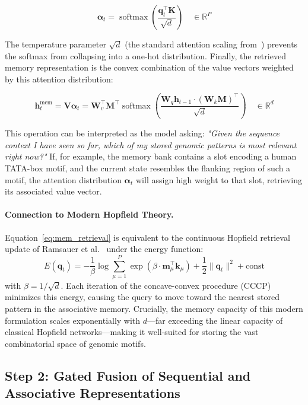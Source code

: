 \documentclass[journal,10pt]{IEEEtran}
\newcommand{\R}{\mathbb{R}}
\newcommand{\softmax}{\operatorname{softmax}}
\begin{document}
\begin{equation}
    \bm{\alpha}_t = \softmax\left( \frac{\bm{q}_t^\top \bm{K}}{\sqrt{d}} \right) \quad \in \R^P
    \label{eq:mem_attention}
\end{equation}

The temperature parameter $\sqrt{d}$ (the standard attention scaling from~\cite{vaswani2017attention}) prevents the softmax from collapsing into a one-hot distribution. Finally, the retrieved memory representation is the convex combination of the value vectors weighted by this attention distribution:

\begin{equation}
    \bm{h}_t^{\text{mem}} = \bm{V} \bm{\alpha}_t = \bm{W}_v^\top \bm{M}^\top \softmax\left( \frac{\bm{W}_q \bm{h}_{t-1} \cdot (\bm{W}_k \bm{M})^\top}{\sqrt{d}} \right) \quad \in \R^d
    \label{eq:mem_retrieval}
\end{equation}

This operation can be interpreted as the model asking: \textit{"Given the sequence context I have seen so far, which of my stored genomic patterns is most relevant right now?"} If, for example, the memory bank contains a slot encoding a human TATA-box motif, and the current state resembles the flanking region of such a motif, the attention distribution $\bm{\alpha}_t$ will assign high weight to that slot, retrieving its associated value vector.

\paragraph{Connection to Modern Hopfield Theory.}
Equation~\eqref{eq:mem_retrieval} is equivalent to the continuous Hopfield retrieval update of Ramsauer et al.~\cite{ramsauer2021hopfield} under the energy function:
\begin{equation}
    E(\bm{q}_t) = -\frac{1}{\beta} \log\sum_{\mu=1}^P \exp\left(\beta \cdot \bm{m}_\mu^\top \bm{k}_\mu\right) + \frac{1}{2}\|\bm{q}_t\|^2 + \text{const}
\end{equation}
with $\beta = 1/\sqrt{d}$. Each iteration of the concave-convex procedure (CCCP) minimizes this energy, causing the query to move toward the nearest stored pattern in the associative memory. Crucially, the memory capacity of this modern formulation scales exponentially with $d$---far exceeding the linear capacity of classical Hopfield networks---making it well-suited for storing the vast combinatorial space of genomic motifs.

\subsection{Step 2: Gated Fusion of Sequential and Associative Representations}
\label{sec:gated_fusion}
\end{document}
